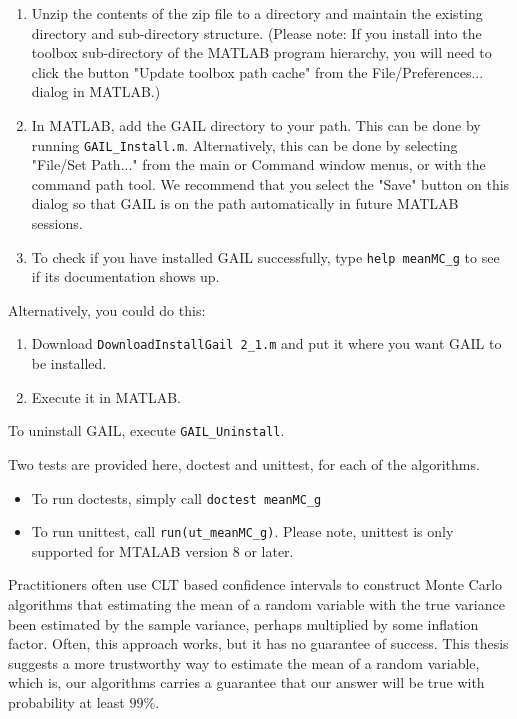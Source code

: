 \documentclass{iitthesis}
\theoremstyle{definition}
\begin{document}
\begin{enumerate}
\item Unzip the contents of the zip file to a directory and maintain the existing directory and sub-directory structure. (Please note: If you install into the toolbox sub-directory of the MATLAB program hierarchy, you will need to click the button "Update toolbox path cache" from the File/Preferences... dialog in MATLAB.)
\item In MATLAB, add the GAIL directory to your path. This can be done by running {\tt GAIL{\_}Install.m}. Alternatively, this can be done by selecting "File/Set Path..." from the main or Command window menus, or with the command path tool. We recommend that you select the "Save" button on this dialog so that GAIL is on the path automatically in future MATLAB sessions.
\item To check if you have installed GAIL successfully, type {\tt help meanMC\_g} to see if its documentation shows up.
\end{enumerate}

Alternatively, you could do this:
\begin{enumerate}
\item Download {\tt DownloadInstallGail 2\_1.m} and put it where you want GAIL to be installed.
\item Execute it in MATLAB.
\end{enumerate}

To uninstall GAIL, execute {\tt GAIL\_Uninstall}.

Two tests are provided here, doctest and unittest, for each of the algorithms.
\begin{itemize}
\item To run doctests, simply call {\tt doctest meanMC\_g}
\item To run unittest, call {\tt run(ut\_meanMC\_g)}. Please note, unittest is only supported for MTALAB version 8 or later.
\end{itemize}


\label{chapter:comclusion}

Practitioners often use CLT based confidence intervals to construct Monte Carlo algorithms that estimating the mean of a random variable with the true variance been estimated by the sample variance, perhaps multiplied by some inflation factor.  Often, this approach works, but it has no guarantee of success. This thesis suggests a more trustworthy way to estimate the mean of a random variable, which is, our algorithms carries a guarantee that our answer will be true with probability at least $99\%$.
\end{document}
